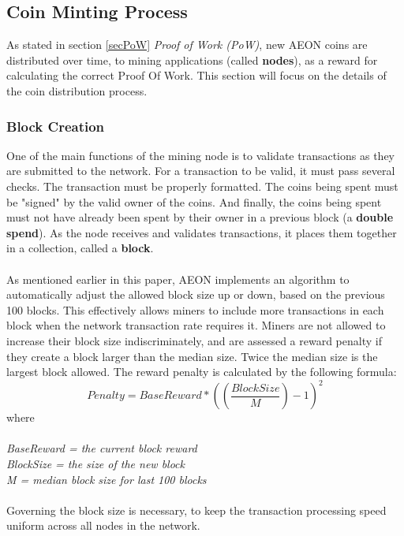 \subsection{Coin Minting Process}
As stated in section \ref{secPoW} \textit{Proof of Work (PoW)}, new AEON coins are distributed over time, to mining applications (called \textbf{nodes}), as a reward for calculating the correct Proof Of Work. This section will focus on the details of the coin distribution process.

\subsubsection{Block Creation}
One of the main functions of the mining node is to validate transactions as they are submitted to the network. For a transaction to be valid, it must pass several checks. The transaction must be properly formatted. The coins being spent must be "signed" by the valid owner of the coins. And finally, the coins being spent must not have already been spent by their owner in a previous block (a \textbf{double spend}). As the node receives and validates transactions, it places them together in a collection, called a \textbf{block}.\\
\\
As mentioned earlier in this paper, AEON implements an algorithm to automatically adjust the allowed block size up or down, based on the previous 100 blocks.  This effectively allows miners to include more transactions in each block when the network transaction rate requires it. Miners are not allowed to increase their block size indiscriminately, and are assessed a reward penalty if they create a block larger than the median size. Twice the median size is the largest block allowed. The reward penalty is calculated by the following formula:
\begin{equation*}
Penalty = BaseReward * ( (\frac{BlockSize}{M}) - 1 )^2 
\end{equation*}
where\\
\\
\textit{
BaseReward = the current block reward\\
BlockSize = the size of the new block\\
M = median block size for last 100 blocks}\\
\\
Governing the block size is necessary, to keep the transaction processing speed uniform across all nodes in the network.

